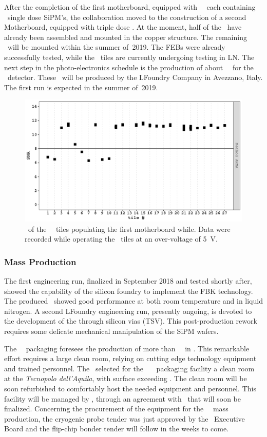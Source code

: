 After the completion of the first motherboard, equipped with \DSkSQBPdmsNumber\ \DSkPdms\ each containing  \DSkTileSiPMsCustomNumber\ single dose SiPM's, the collaboration moved to the construction of a second Motherboard, equipped with triple dose \SiPMs.   At the moment, half of the \DSkPdms\ have already been assembled and mounted in the copper structure. The remaining \DSkPdms\ will be mounted within the summer of~2019.  The FEBs were already successfully tested, while the \SiPM\ tiles are currently undergoing testing in LN. The next step in the photo-electronics schedule is the production of about  \DSkPdmsSecondBatchNumber\ \DSkPdms\ for the \DSps\ detector. These \SiPMs\ will be produced by the LFoundry Company in Avezzano, Italy.  The first run is expected in the summer of~2019. 

\begin{figure}[t!]
\includegraphics[width=0.5\columnwidth]{./Figures/SNR2.PDF}
\caption[\SNR\ of the \SiPMs\ tiles of the first motherboard]{\SNR\ of the \DSkSQBPdmsNumber\ \SiPM\ tiles populating the first motherboard while.  Data were recorded while operating the \SiPM\ tiles at an over-voltage of \SI{5}{\volt}.}
\label{fig:SNR2} 
\end{figure} 


\subsubsection{Mass Production}

The first engineering run, finalized in September 2018 and tested shortly after, showed the capability of the silicon foundry to implement the FBK technology.  The produced \SiPMs\ showed good performance at both room temperature and in liquid nitrogen. A second LFoundry engineering run, presently ongoing, is devoted to the development of the through silicon vias (TSV). This post-production rework requires some delicate mechanical manipulation of the SiPM wafers.

The \DSks\ \SiPM\ packaging foresees the production of more than \DSkPdmsNumberWithSpares\ \DSkPdms\ in \DSkPdmsContructionTime. This remarkable effort requires a large clean room, relying on cutting edge technology equipment and trained personnel.  The \GADMC\ selected for the \NOA\ \DSks\ \SiPM\ packaging facility a clean room at the {\it Tecnopolo dell'Aquila}, with surface exceeding \DSkPdmsCleanRoomSurface.  The clean room will be soon refurbished to comfortably host the needed equipment and personnel.  This facility will be managed by \GSSI, through an agreement with \INFN\ that will soon be finalized.  Concerning the procurement of the equipment for the \DSks\ \DSkPdms\ mass production, the cryogenic probe tender was just approved by the \INFN\ Executive Board and the flip-chip bonder tender will follow in the weeks to come.